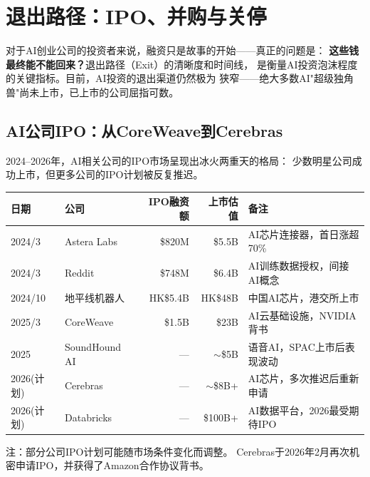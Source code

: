 \section{退出路径：IPO、并购与关停}
\label{sec:fund-exits}

对于AI创业公司的投资者来说，融资只是故事的开始——真正的问题是：
\textbf{这些钱最终能不能回来？}退出路径（Exit）的清晰度和时间线，
是衡量AI投资泡沫程度的关键指标。目前，AI投资的退出渠道仍然极为
狭窄——绝大多数AI"超级独角兽"尚未上市，已上市的公司屈指可数。

\subsection{AI公司IPO：从CoreWeave到Cerebras}
\label{subsec:fund-ipo}

2024--2026年，AI相关公司的IPO市场呈现出冰火两重天的格局：
少数明星公司成功上市，但更多公司的IPO计划被反复推迟。

\begin{keybox}[2024--2026 AI相关公司IPO汇总]
\small
\begin{tabularx}{\textwidth}{l l r r X}
\toprule
\rowcolor{figLightGray}
\textbf{日期} & \textbf{公司} & \textbf{IPO融资额}
  & \textbf{上市估值} & \textbf{备注} \\
\midrule
2024/3  & Astera Labs    & \$820M  & \$5.5B
  & AI芯片连接器，首日涨超70\% \\
2024/3  & Reddit         & \$748M  & \$6.4B
  & AI训练数据授权，间接AI概念 \\
2024/10 & 地平线机器人     & HK\$5.4B & HK\$48B
  & 中国AI芯片，港交所上市 \\
\midrule
2025/3  & CoreWeave      & \$1.5B  & \$23B
  & AI云基础设施，NVIDIA背书 \\
2025    & SoundHound AI  & ---     & $\sim$\$5B
  & 语音AI，SPAC上市后表现波动 \\
\midrule
2026(计划) & Cerebras    & ---     & $\sim$\$8B+
  & AI芯片，多次推迟后重新申请 \\
2026(计划) & Databricks  & ---     & \$100B+
  & AI数据平台，2026最受期待IPO \\
\bottomrule
\end{tabularx}

\medskip
\noindent 注：部分公司IPO计划可能随市场条件变化而调整。
Cerebras于2026年2月再次机密申请IPO，并获得了Amazon合作协议背书。
\end{keybox}

